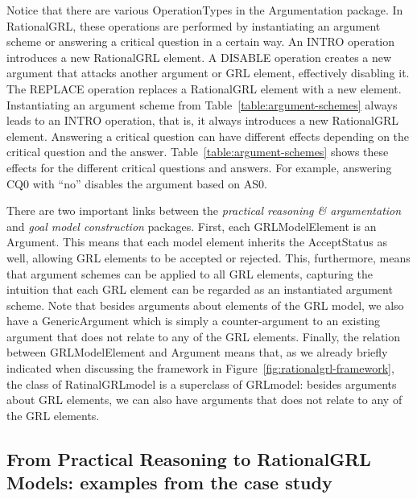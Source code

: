 Notice that there are various \textsf{OperationTypes} in the Argumentation package. In RationalGRL, these operations are performed by instantiating an argument scheme or answering a critical question in a certain way. An \textsf{INTRO} operation introduces a new RationalGRL element. A \textsf{DISABLE} operation creates a new argument that attacks another argument or GRL element, effectively disabling it. The \textsf{REPLACE} operation replaces a RationalGRL element with a new element. Instantiating an argument scheme from Table~\ref{table:argument-schemes} always leads to an \textsf{INTRO} operation, that is, it always introduces a new RationalGRL element. Answering a critical question can have different effects depending on the critical question and the answer. Table~\ref{table:argument-schemes} shows these effects for the different critical questions and answers. For example, answering CQ0 with ``no'' disables the argument based on AS0. 

There are two important links between the \emph{practical reasoning \& argumentation} and \emph{goal model construction} packages. First, each \textsf{GRLModelElement} is an \textsf{Argument}. This means that each model element inherits the \textsf{AcceptStatus} as well, allowing GRL elements to be accepted or rejected. This, furthermore, means that argument schemes can be applied to all GRL elements, capturing the intuition that each GRL element can be regarded as an instantiated argument scheme. Note that besides arguments about elements of the GRL model, we also have a \textsf{GenericArgument} which is simply a counter-argument to an existing argument that does not relate to any of the GRL elements. Finally, the relation between \textsf{GRLModelElement} and \textsf{Argument} means that, as we already briefly indicated when discussing the framework in Figure~\ref{fig:rationalgrl-framework}, the class of \textsf{RatinalGRLmodel} is a superclass of \textsf{GRLmodel}: besides arguments about GRL elements, we can also have arguments that does not relate to any of the GRL elements.

\subsection{From Practical Reasoning to RationalGRL Models: examples from the case study}
\label{sect:overview:examples}

